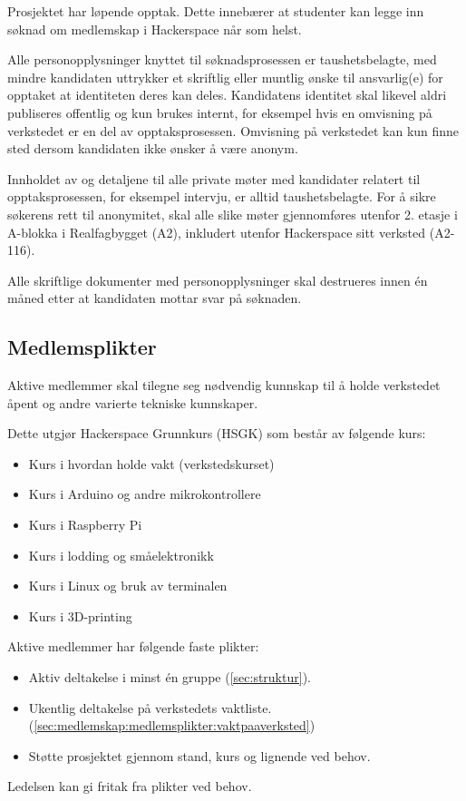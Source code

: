 Prosjektet har løpende opptak. Dette innebærer at studenter kan legge inn
søknad om medlemskap i Hackerspace når som helst.

Alle personopplysninger knyttet til søknadsprosessen er taushetsbelagte, med mindre kandidaten uttrykker et skriftlig eller muntlig ønske til ansvarlig(e) for opptaket at identiteten deres kan deles.
Kandidatens identitet skal likevel aldri publiseres offentlig og kun brukes internt, for eksempel hvis en omvisning på verkstedet er en del av opptaksprosessen.
Omvisning på verkstedet kan kun finne sted dersom kandidaten ikke ønsker å være anonym.

Innholdet av og detaljene til alle private møter med kandidater relatert til opptaksprosessen, for eksempel intervju, er alltid taushetsbelagte.
For å sikre søkerens rett til anonymitet, skal alle slike møter gjennomføres utenfor 2. etasje i A-blokka i Realfagbygget (A2), inkludert utenfor Hackerspace sitt verksted (A2-116).

Alle skriftlige dokumenter med personopplysninger skal destrueres innen én måned etter at kandidaten mottar svar på søknaden.

\subsection{Medlemsplikter}\label{sec:medlemskap:medlemsplikter}
Aktive medlemmer skal tilegne seg nødvendig kunnskap til å holde verkstedet åpent og andre varierte tekniske kunnskaper.

Dette utgjør Hackerspace Grunnkurs (HSGK) som består av følgende kurs:

\begin{itemize}
\item Kurs i hvordan holde vakt (verkstedskurset)
\item Kurs i Arduino og andre mikrokontrollere
\item Kurs i Raspberry Pi
\item Kurs i lodding og småelektronikk
\item Kurs i Linux og bruk av terminalen
\item Kurs i 3D-printing
\end{itemize}

Aktive medlemmer har følgende faste plikter:
\begin{itemize}
\item Aktiv deltakelse i minst én gruppe (\ref{sec:struktur}).
\item Ukentlig deltakelse på verkstedets vaktliste. (\ref{sec:medlemskap:medlemsplikter:vaktpaaverksted})
\item Støtte prosjektet gjennom stand, kurs og lignende ved behov.
\end{itemize}
Ledelsen kan gi fritak fra plikter ved behov.

